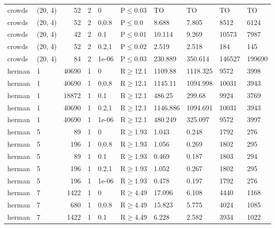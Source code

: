 \begin{longtable}{llrrllllll}
 crowds        & (20, 4)   &     	52 &    2 & 0     & P$\leq$0.03  & TO       & TO       & TO      & TO     \\
 crowds        & (20, 4)   &     	52 &    2 & 0,0.8 & P$\leq$0.0   & 8.688    & 7.805    & 8512    & 6124   \\
 crowds        & (20, 4)   &     	42 &    2 & 0.1   & P$\leq$0.01  & 10.114   & 9.269    & 10573   & 7987   \\
 crowds        & (20, 4)   &     	52 &    2 & 0.2,1 & P$\leq$0.02  & 2.519    & 2.518    & 184     & 145    \\
 crowds        & (20, 4)   &     	84 &    2 & 1e-06 & P$\leq$0.03  & 230.889  & 350.614  & 146527  & 199690 \\
 herman        & 1         &  	40690 &    1 & 0     & R$\geq$12.1  & 1109.88  & 1118.325 & 9572    & 3998   \\
 herman        & 1         &  	40690 &    1 & 0,0.8 & R$\geq$12.1  & 1145.11  & 1094.998 & 10031   & 3943   \\
 herman        & 1         &  	18872 &    1 & 0.1   & R$\geq$12.1  & 486.25   & 299.68   & 9924    & 3769   \\
 herman        & 1         &  	40690 &    1 & 0.2,1 & R$\geq$12.1  & 1146.886 & 1094.691 & 10031   & 3943   \\
 herman        & 1         &  	40690 &    1 & 1e-06 & R$\geq$12.1  & 480.249  & 325.097  & 9572    & 3997   \\
 herman        & 5         &     	89 &    1 & 0     & R$\geq$1.93  & 1.043    & 0.248    & 1792    & 276    \\
 herman        & 5         &    	196 &    1 & 0,0.8 & R$\geq$1.93  & 1.056    & 0.269    & 1802    & 295    \\
 herman        & 5         &     	89 &    1 & 0.1   & R$\geq$1.93  & 0.469    & 0.187    & 1803    & 294    \\
 herman        & 5         &    	196 &    1 & 0.2,1 & R$\geq$1.93  & 1.052    & 0.267    & 1802    & 295    \\
 herman        & 5         &    	196 &    1 & 1e-06 & R$\geq$1.93  & 0.478    & 0.197    & 1792    & 276    \\
 herman        & 7         &   	1422 &    1 & 0     & R$\geq$4.49  & 17.096   & 6.108    & 4440    & 1168   \\
 herman        & 7         &    	680 &    1 & 0,0.8 & R$\geq$4.49  & 15.823   & 5.775    & 4024    & 1085   \\
 herman        & 7         &   	1422 &    1 & 0.1   & R$\geq$4.49  & 6.228    & 2.582    & 3934    & 1022   \\

\end{longtable}

